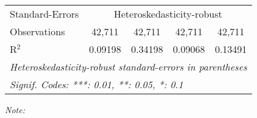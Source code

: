 \begin{table}[htbp!]
\begin{adjustbox}{width = 1\textwidth, max height = 0.95\textheight, center}
\begin{threeparttable}[b]
\begin{tabular}{lcccc}
            \midrule 
            Standard-Errors & \multicolumn{4}{c}{Heteroskedasticity-robust} \\ 
            Observations         & 42,711                         & 42,711                         & 42,711                         & 42,711\\  
            R$^2$                & 0.09198                        & 0.34198                        & 0.09068                        & 0.13491\\  
            \midrule \midrule
            \multicolumn{5}{l}{\emph{Heteroskedasticity-robust standard-errors in parentheses}}\\
            \multicolumn{5}{l}{\emph{Signif. Codes: ***: 0.01, **: 0.05, *: 0.1}}\\
         \end{tabular}
         
         \begin{tablenotes}\item \medskip \textit{Note:}
         \end{tablenotes}
      \end{threeparttable}
   \end{adjustbox}
\end{table}


